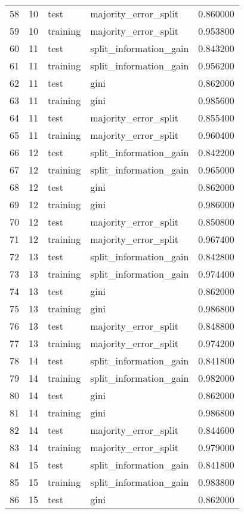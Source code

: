 \begin{tabular}{lrllr}
58 & 10 & test & majority_error_split & 0.860000 \\
59 & 10 & training & majority_error_split & 0.953800 \\
60 & 11 & test & split_information_gain & 0.843200 \\
61 & 11 & training & split_information_gain & 0.956200 \\
62 & 11 & test & gini & 0.862000 \\
63 & 11 & training & gini & 0.985600 \\
64 & 11 & test & majority_error_split & 0.855400 \\
65 & 11 & training & majority_error_split & 0.960400 \\
66 & 12 & test & split_information_gain & 0.842200 \\
67 & 12 & training & split_information_gain & 0.965000 \\
68 & 12 & test & gini & 0.862000 \\
69 & 12 & training & gini & 0.986000 \\
70 & 12 & test & majority_error_split & 0.850800 \\
71 & 12 & training & majority_error_split & 0.967400 \\
72 & 13 & test & split_information_gain & 0.842800 \\
73 & 13 & training & split_information_gain & 0.974400 \\
74 & 13 & test & gini & 0.862000 \\
75 & 13 & training & gini & 0.986800 \\
76 & 13 & test & majority_error_split & 0.848800 \\
77 & 13 & training & majority_error_split & 0.974200 \\
78 & 14 & test & split_information_gain & 0.841800 \\
79 & 14 & training & split_information_gain & 0.982000 \\
80 & 14 & test & gini & 0.862000 \\
81 & 14 & training & gini & 0.986800 \\
82 & 14 & test & majority_error_split & 0.844600 \\
83 & 14 & training & majority_error_split & 0.979000 \\
84 & 15 & test & split_information_gain & 0.841800 \\
85 & 15 & training & split_information_gain & 0.983800 \\
86 & 15 & test & gini & 0.862000 \\

\end{tabular}
